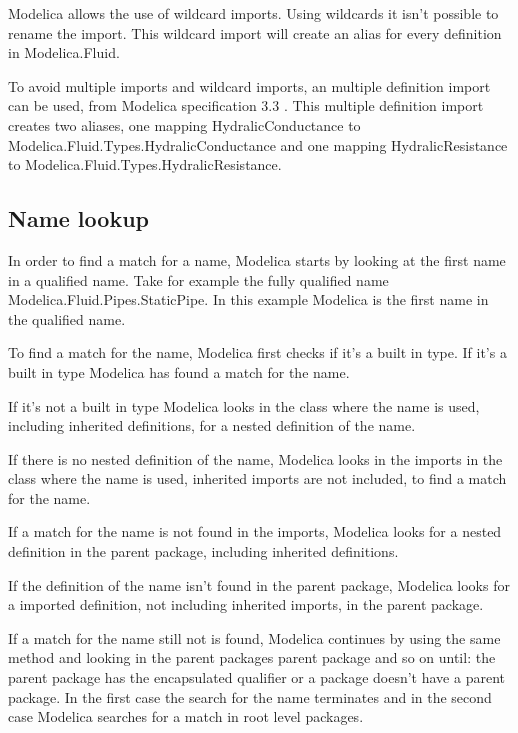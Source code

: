 \documentclass{cslthse-msc}
\begin{document}


Modelica allows the use of wildcard imports. Using wildcards it isn't possible to rename the import. This wildcard import will create an alias for every definition in Modelica.Fluid.



To avoid multiple imports and wildcard imports, an multiple definition import can be used, from Modelica specification 3.3 \cite{modelicamodelica}. This multiple definition import creates two aliases, one mapping HydralicConductance to Modelica.Fluid.Types.HydralicConductance and one mapping HydralicResistance to Modelica.Fluid.Types.HydralicResistance.



\subsection{Name lookup}
In order to find a match for a name, Modelica starts by looking at the first name in a qualified name. Take for example the fully qualified name Modelica.Fluid.Pipes.StaticPipe. In this example Modelica is the first name in the qualified name.

To find a match for the name, Modelica first checks if it's a built in type. If it's a built in type Modelica has found a match for the name.

If it's not a built in type Modelica looks in the class where the name is used, including inherited definitions, for a nested definition of the name. 

If there is no nested definition of the name, Modelica looks in the imports in the class where the name is used, inherited imports are not included, to find a match for the name.

If a match for the name is not found in the imports, Modelica looks for a nested definition in the parent package, including inherited definitions.

If the definition of the name isn't found in the parent package, Modelica looks for a imported definition, not including inherited imports, in the parent package.

If a match for the name still not is found, Modelica continues by using the same method and looking in the parent packages parent package and so on until: the parent package has the encapsulated qualifier or a package doesn't have a parent package. In the first case the search for the name terminates and in the second case Modelica searches for a match in root level packages.
\end{document}
